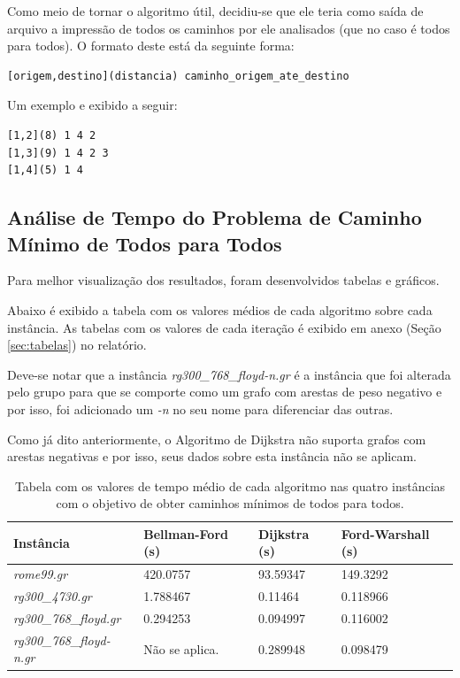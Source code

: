 \documentclass[12pt]{article}
\begin{document}
Como meio de tornar o algoritmo útil, decidiu-se que ele teria como saída de arquivo a impressão de todos os caminhos por ele analisados (que no caso é todos para todos). O formato deste está da seguinte forma:

\begin{verbatim}
[origem,destino](distancia) caminho_origem_ate_destino
\end{verbatim}

Um exemplo e exibido a seguir:

\begin{verbatim}
[1,2](8) 1 4 2
[1,3](9) 1 4 2 3
[1,4](5) 1 4
\end{verbatim}

\subsection{Análise de Tempo do Problema de Caminho Mínimo de Todos para Todos}

Para melhor visualização dos resultados, foram desenvolvidos tabelas e gráficos.

Abaixo é exibido a tabela com os valores médios de cada algoritmo sobre cada instância. As tabelas com os valores de cada iteração é exibido em anexo (Seção \ref{sec:tabelas}) no relatório.

Deve-se notar que a instância \textit{rg300\_768\_floyd-n.gr} é a instância que foi alterada pelo grupo para que se comporte como um grafo com arestas de peso negativo e por isso, foi adicionado um \textit{-n} no seu nome para diferenciar das outras. 

Como já dito anteriormente, o Algoritmo de Dijkstra não suporta grafos com arestas negativas e por isso, seus dados sobre esta instância não se aplicam.

\begin{table}[H]
	\centering
	\caption{Tabela com os valores de tempo médio de cada algoritmo nas quatro instâncias com o objetivo de obter caminhos mínimos de todos para todos.}
    \begin{tabular}{l|lll}
    \hline
    \textbf{Instância} & \textbf{Bellman-Ford (s)} & \textbf{Dijkstra (s)} & \textbf{Ford-Warshall (s)} \\ \hline \hline
   \textit{ rome99.gr}         & 420.0757                           & 93.59347                          & 149.3292                            \\
   \textit{ rg300\_4730.gr}         & 1.788467                           & 0.11464                          & 0.118966                            \\
   \textit{ rg300\_768\_floyd.gr}         & 0.294253                           & 0.094997                          & 0.116002                            \\
   \textit{ rg300\_768\_floyd-n.gr}  & Não se aplica.       & 0.289948                           & 0.098479                            \\ \hline
    \end{tabular}
\end{table}
\end{document}
